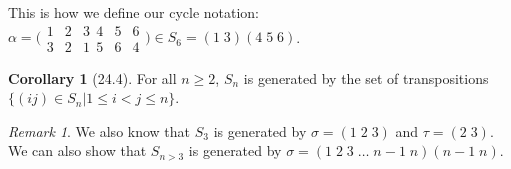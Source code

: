\documentclass{article}
\theoremstyle{definition}
\newtheorem*{cor}{Corollary}
\theoremstyle{remark}
\newtheorem*{rmk}{Remark}
\begin{document}
{{            \noindent This is how we define our cycle notation: $\alpha=\big(\begin{smallmatrix} 1&2&3 \ \ 4&5&6 \\ 3&2&1 \ \ 5&6&4\end{smallmatrix}\big) \in S_6=(1\;3)(4\;5\;6)$.
            
            \begin{cor}[24.4]
                For all $n\geq2$, $S_n$ is generated by the set of transpositions $\{(ij)\in S_n|1\leq i<j\leq n\}$.
            \end{cor}
            
            \begin{rmk}
                We also know that $S_3$ is generated by $\sigma=(1\;2\;3)$ and $\tau=(2\;3)$. We can also show that $S_{n>3}$ is generated by $\sigma=(1\;2\;3\;\ldots\;n-1\;n)(n-1\;n)$.
            \end{rmk}
        }
    }
    
\end{document}
